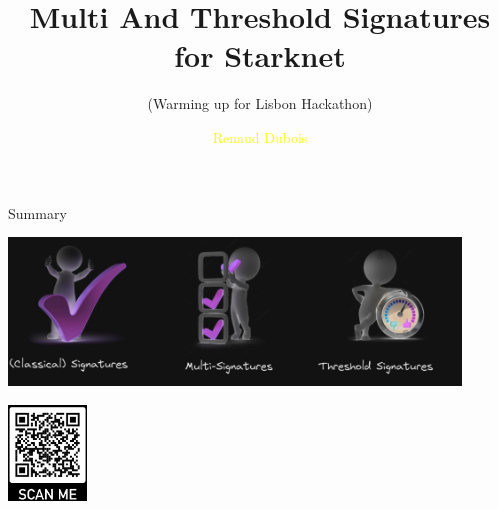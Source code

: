 \documentclass[aspectratio=43]{beamer}
\title{Multi And Threshold Signatures for Starknet} %
\subtitle{(Warming up for Lisbon Hackathon)}
\author[R. Dubois]{\textcolor{yellow}{Renaud Dubois} }
\institute[LIT]{
    \textcolor{white}{Ledger}%
    \\%
    \textcolor{white}{Innovation Team}%
    \date{\today}
    
    
} %
\begin{document}
    
    \frame{\titlepage }
   

    \begin{frame}{Summary}
     
     {
     \begin{center}
     \includegraphics[width=12cm]{images/concepts.jpg}
     \end{center}
     }
     {
        \tableofcontents
        \begin{center}
        \includegraphics[width=2.1cm]{images/qrslides.jpg}
        \end{center}
      }  
   
    \end{frame} 
\end{document}
